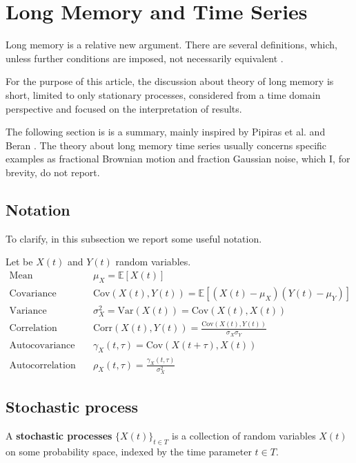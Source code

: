 \section{Long Memory and Time Series}
Long memory is a relative new argument. There are several definitions, which, unless further conditions are imposed, not necessarily equivalent \cite{pipiras_taqqu_2017}.

For the purpose of this article, the discussion about theory of long memory is short, limited to only stationary processes, considered from a time domain perspective and focused on the interpretation of results.

The following section is is a summary, mainly inspired by Pipiras et al. \cite{pipiras_taqqu_2017} and Beran \cite{Beran:2304008}. The theory about long memory time series usually concerns specific examples as fractional Brownian motion and fraction Gaussian noise, which I, for brevity, do not report.

\subsection{Notation}
To clarify, in this subsection we report some useful notation.

Let be $X(t)$ and $Y(t)$ random variables.
\begin{align}
\text{Mean}\quad &\mu_X = \mathbb{E}[X(t)] \\
\text{Covariance}\quad &\text{Cov}(X(t), Y(t)) = \mathbb{E}[(X(t) - \mu_X)(Y(t) - \mu_Y)] \\
\text{Variance}\quad &\sigma^2_X = \text{Var}(X(t)) = \text{Cov}(X(t), X(t)) \\
\text{Correlation}\quad &\text{Corr}(X(t), Y(t)) = \frac{\text{Cov}(X(t), Y(t))}{\sigma_X  \sigma_Y } \\
\text{Autocovariance}\quad &\gamma_X(t, \tau) = \text{Cov}(X(t+\tau), X(t)) \\
\text{Autocorrelation}\quad &\rho_X(t, \tau) = \frac{\gamma_X(t, \tau)}{\sigma^2_X}
\end{align}

\subsection{Stochastic process}
\begin{definition}
	A \textbf{stochastic processes} $\{X(t)\}_{t \in T}$ is a collection of random variables $X(t)$ on some probability space, indexed by the time parameter $t \in T$.
\end{definition}

